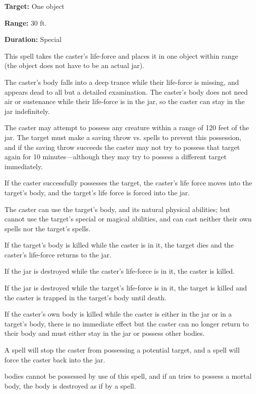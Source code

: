 \begin{multicols*}{2}
{\textbf{Target:} One object

\textbf{Range:} 30 ft.

\textbf{Duration:} Special}

This spell takes the caster’s life-force and places it in one object within range (the object does not have to be an actual jar).

The caster’s body falls into a deep trance while their life-force is missing, and appears dead to all but a detailed examination. The caster’s body does not need air or sustenance while their life-force is in the jar, so the caster can stay in the jar indefinitely.

The caster may attempt to possess any creature within a range of 120 feet of the jar. The target must make a saving throw vs. spells to prevent this possession, and if the saving throw succeeds the caster may not try to possess that target again for 10 minutes—although they may try to possess a different target immediately.

If the caster successfully possesses the target, the caster’s life force moves into the target’s body, and the target’s life force is forced into the jar.

The caster can use the target’s body, and its natural physical abilities; but cannot use the target’s special or magical abilities, and can cast neither their own spells nor the target’s spells.

If the target’s body is killed while the caster is in it, the target dies and the caster’s life-force returns to the jar.

If the jar is destroyed while the caster’s life-force is in it, the caster is killed.

If the jar is destroyed while the target’s life-force is in it, the target is killed and the caster is trapped in the target’s body until death.

If the caster’s own body is killed while the caster is either in the jar or in a target’s body, there is no immediate effect but the caster can no longer return to their body and must either stay in the jar or possess other bodies.

A  spell will stop the caster from possessing a potential target, and a  spell will force the caster back into the jar.

 bodies cannot be possessed by use of this spell, and if an  tries to possess a mortal body, the body is destroyed as if by a  spell.


\end{multicols*}
